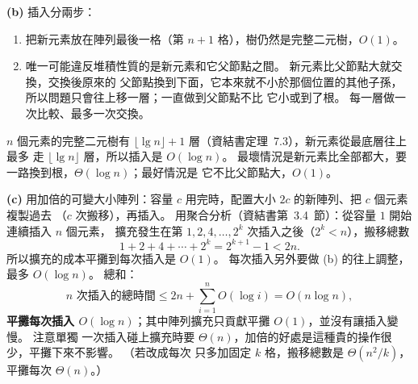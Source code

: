 \begin{pastsoln}
\textbf{(b)} 插入分兩步：
\begin{enumerate}
\item 把新元素放在陣列最後一格（第 $n + 1$ 格），樹仍然是完整二元樹，$O(1)$。
\item 唯一可能違反堆積性質的是新元素和它父節點之間。 新元素比父節點大就交換，交換後原來的
父節點換到下面，它本來就不小於那個位置的其他子孫，所以問題只會往上移一層；一直做到父節點不比
它小或到了根。 每一層做一次比較、最多一次交換。
\end{enumerate}
$n$ 個元素的完整二元樹有 $\lfloor \lg n \rfloor + 1$ 層（資結書定理~7.3），新元素從最底層往上最多
走 $\lfloor \lg n \rfloor$ 層，所以插入是 $O(\log n)$。 最壞情況是新元素比全部都大，要一路換到根，$\Theta(\log n)$；最好情況是
它不比父節點大，$O(1)$。

\textbf{(c)} 用加倍的可變大小陣列：容量 $c$ 用完時，配置大小 $2c$ 的新陣列、把 $c$ 個元素複製過去
（$c$ 次搬移），再插入。 用聚合分析（資結書第~3.4~節）：從容量 $1$ 開始連續插入 $n$ 個元素，
擴充發生在第 $1, 2, 4, \ldots, 2^{k}$ 次插入之後（$2^{k} < n$），搬移總數
\[
1 + 2 + 4 + \cdots + 2^{k} = 2^{k+1} - 1 < 2n .
\]
所以擴充的成本平攤到每次插入是 $O(1)$。 每次插入另外要做 (b) 的往上調整，最多
$O(\log n)$。 總和：
\[
n \text{ 次插入的總時間} \le 2n + \sum_{i=1}^{n} O(\log i) = O(n \log n),
\]
\textbf{平攤每次插入 $O(\log n)$}；其中陣列擴充只貢獻平攤 $O(1)$，並沒有讓插入變慢。 注意單獨
一次插入碰上擴充時要 $\Theta(n)$，加倍的好處是這種貴的操作很少，平攤下來不影響。 （若改成每次
只多加固定 $k$ 格，搬移總數是 $\Theta(n^2/k)$，平攤每次 $\Theta(n)$。）
\end{pastsoln}

